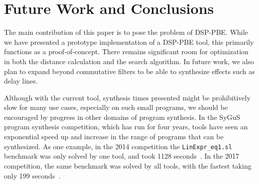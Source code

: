 \section{Future Work and Conclusions}

The main contribution of this paper is to pose the problem of DSP-PBE.
While we have presented a prototype implementation of a DSP-PBE tool, this primarily functions as a proof-of-concept.
There remains significant room for optimization in both the distance calculation and the search algorithm.
In future work, we also plan to expand beyond commutative filters to be able to synthesize effects such as delay lines.

Although with the current tool, synthesis times presented might be prohibitively slow for many use cases, especially on such small programs, we should be encouraged by progress in other domains of program synthesis.
In the SyGuS program synthesis competition, which has run for four years, tools have seen an exponential speed up and increase in the range of programs that can be synthesized.
As one example, in the 2014 competition the \texttt{LinExpr\_eq1.sl} benchmark was only solved by one tool, and took 1128 seconds~\cite{sygus2014}.
In the 2017 competition, the same benchmark was solved by all tools, with the fastest taking only 199 seconds~\cite{sygus2017}.

